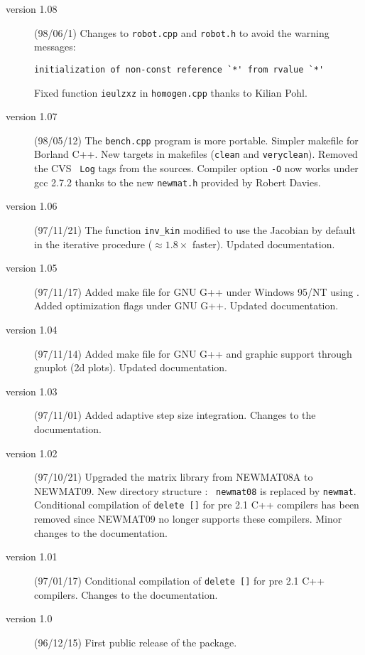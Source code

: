 \documentclass[11pt,fleqn,letterpaper]{report}
\begin{document}
\begin{description}
\item[version 1.08] (98/06/1) Changes to  {\tt robot.cpp} and {\tt robot.h} to avoid the
warning messages: \par
{\small \verb$initialization of non-const reference `*' from rvalue `*'$} \par
Fixed function {\tt ieulzxz} in {\tt homogen.cpp} thanks to Kilian Pohl. 

\item[version 1.07] (98/05/12) The {\tt bench.cpp} program is more
  portable.  Simpler makefile for\textsf{ Borland C++}. New targets in
  makefiles ({\tt clean} and {\tt veryclean}).  Removed the CVS {\tt
    Log} tags from the sources. Compiler option {\tt -O} now works
  under \textsf{gcc} 2.7.2 thanks to the new {\tt newmat.h} provided
  by Robert Davies.

\item[version 1.06] (97/11/21) The function {\tt inv\_kin} modified to
use the Jacobian by default in the iterative procedure ($\approx 1.8\times$ faster). 
Updated documentation.

\item[version 1.05] (97/11/17) Added make file for\textsf{ GNU G++}
  under \textsf{ Windows 95/NT} using
  .  Added optimization
  flags under \textsf{GNU G++}. Updated documentation.
  
\item[version 1.04] (97/11/14) Added make file for \textsf{GNU G++}
  and graphic support through \textsf{gnuplot} (2d plots). Updated
  documentation.

\item[version 1.03] (97/11/01) Added adaptive step size integration.
Changes to the documentation.

\item[version 1.02] (97/10/21) Upgraded the matrix library from
  \textsf{NEWMAT08A} to NEWMAT09. New directory structure : {\tt
    newmat08} is replaced by {\tt newmat}. Conditional compilation of
  {\tt delete []} for pre 2.1 C++ compilers has been removed since
  \textsf{NEWMAT09} no longer supports these compilers.  Minor changes
  to the documentation.

\item[version 1.01] (97/01/17) Conditional compilation of {\tt delete []} for pre 2.1 C++ compilers.
Changes to the documentation.


\item[version 1.0] (96/12/15) First public release of the package.
\end{description}
\newpage
\end{document}
